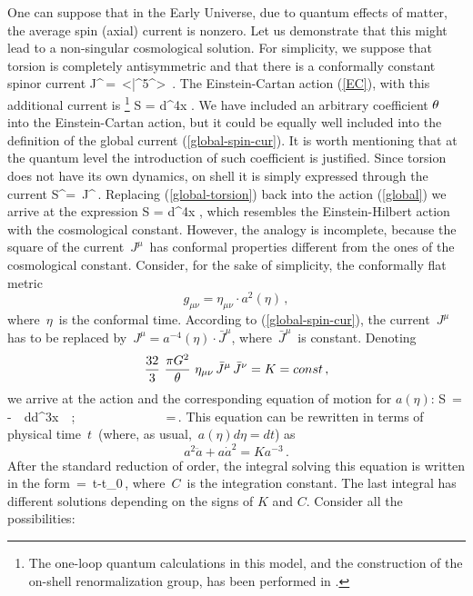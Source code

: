 One can suppose that in the Early Universe, due to quantum
effects of matter, the average spin (axial) current is nonzero. 
Let us demonstrate that this might lead to a non-singular 
cosmological solution. For simplicity, we suppose that torsion is
completely antisymmetric and that there is a 
conformally constant spinor current
\beq
J^\mu \,=\, <{\bar \psi}\ga^5\ga^\mu\psi> \,. 
\label{global-spin-cur}
\eeq
The Einstein-Cartan action
(\ref{EC}), with this additional current is \cite{bonsh}
\footnote{The one-loop quantum calculations in this model, 
and the construction of the on-shell 
renormalization group, has been performed in \cite{bonsh}.}
\beq
S = \int d^4x\,\,.
\label{global}
\eeq
We have included an arbitrary coefficient $\theta$ into the 
Einstein-Cartan action, but it could be equally well included 
into the definition of the global current (\ref{global-spin-cur}). 
It is worth mentioning that at the quantum level the introduction 
of such coefficient is justified. Since torsion does not
have its own dynamics, on shell it is simply expressed through
the current
\beq
S^\mu = \,J^\mu\,.
\label{global-torsion}
\eeq
Replacing (\ref{global-torsion}) back into the action
(\ref{global}) we arrive at the expression 
\beq
S = \int d^4x\,\,,
\label{new-global}
\eeq
which resembles the Einstein-Hilbert action with the cosmological
constant. However, the analogy is incomplete, because the
square of the current $\,J^\mu\,$ has conformal properties
different from the ones of the cosmological constant. 
Consider, for the sake of simplicity, the conformally flat metric
$$
g_{\mu\nu} = \eta_{\mu\nu}\cdot a^2(\eta)\,,
$$
where $\,\eta\,$ is the conformal time. According to
(\ref{global-spin-cur}), the current $\,J^\mu\,$ has to be
replaced by $\,J^\mu = a^{-4}(\eta)\cdot {\bar J}^\mu$, where
$\,{\bar J}^\mu\,$ is constant. Denoting
$$
\frac{32}{3}\,\,\frac{\pi G^2}{\theta}\,\,
\eta_{\mu\nu}\,{\bar J}^\mu \,{\bar J}^\nu = K = const\,, 
$$
we arrive at the action and the corresponding equation 
of motion for $a(\eta)$:
\beq
S \,=\, -\, \,
\int d\eta \int d^3x \,\,\,\,;\,\,\,\,\,\,\,\,\,\,\,\,\,\,\,\,\,\, 
\,\,\,\,\,\,\,\,\,\,\,\,\,\,\,\,\,\,\,\,\,
=\,.
\label{vse-global}
\eeq
This equation can be rewritten in terms of physical time $\,t\,$
(where, as usual, $\,a(\eta)d\eta=dt$) as
$$
a^2{\ddot a} + a {\dot a}^2 = Ka^{-3}\,.
$$
After the standard reduction of order, the integral solving this
equation is written in the form
\beq
\int {} \,=\, t-t_0\,,
\label{intergral-global}
\eeq
where $\,C\,$ is the integration constant. The last integral
has different solutions depending on the signs of $K$ and $C$.
Consider all the possibilities:  
\vskip 2mm

